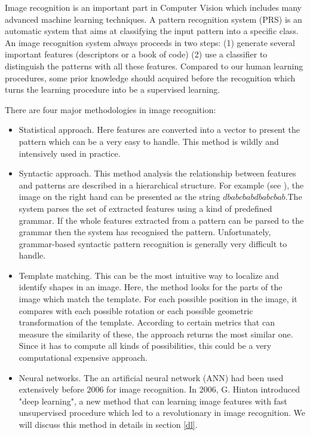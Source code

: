 Image recognition is an important part in Computer Vision which includes many advanced machine learning techniques. A pattern recognition system (PRS) is an automatic system that aims at classifying the input pattern into a specific class\cite{kpalma2007overview}. An image recognition system
always proceeds in two steps: (1) generate several important features (descriptors or a book of code) (2) use a classifier
to distinguish the patterns with all these features. Compared to our human learning procedures, some prior knowledge should acquired
before the recognition which turns the learning procedure into be a supervised learning.

There are four major methodologies in image recognition:
\begin{itemize}
  \item Statistical approach. Here features are converted into a vector to present the pattern which can be a very easy to handle. This method
        is wildly and intensively used in practice.

  \item Syntactic approach. This method analysis the relationship between features and patterns are described in a hierarchical structure. For example
        (see ), the image on the right hand can be presented as the string ${d b a b c b a b d b a b c b a b}$.The system parses the set of extracted features using a kind of predefined grammar. If the whole features extracted from a pattern can be parsed to the grammar then the system has recognised the pattern. Unfortunately, grammar-based syntactic pattern recognition is generally very difficult to handle.

  \item Template matching. This can be the most intuitive way to localize and identify shapes in an image. Here, the method looks for the parts of the
        image which match the template. For each possible position in the image, it compares with each possible rotation or each possible geometric transformation of the template. According to certain metrics that can measure the similarity of these, the approach returns the most similar one. Since it has to compute all kinds of possibilities, this could be a very computational expensive approach.
  \item Neural networks. The an artificial neural network (ANN) had been used extensively before 2006 for image recognition. In 2006,  G. Hinton introduced "deep learning", a new method that can learning image features with fast unsupervised procedure which led to a revolutionary in image recognition\cite{hinton06}. We will
      discuss this method in details in section \ref{dl}.
\end{itemize}
